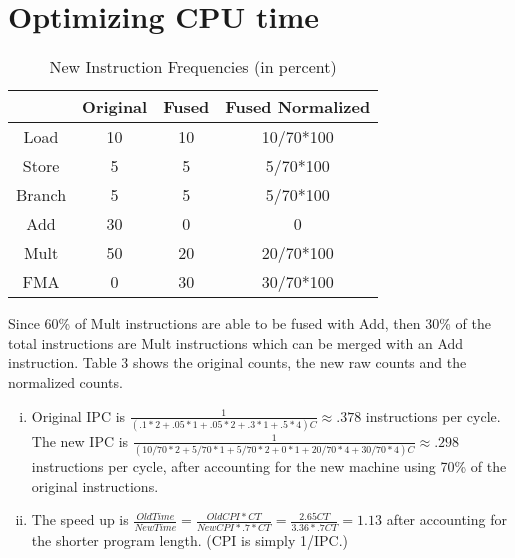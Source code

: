 \documentclass[a4paper,11pt]{article}
\theoremstyle{mytheor}
\begin{document}
\section{Optimizing CPU time}
\begin{table}[H]
\caption{New Instruction Frequencies (in percent)}
\begin{center}
\begin{tabular}{|c|c|c|c|}
\hline
&Original & Fused & Fused Normalized\\
\hline
Load & 10 & 10 & 10/70*100\\
Store & 5 & 5 & 5/70*100\\
Branch & 5 & 5 & 5/70*100\\
Add & 30 & 0 & 0\\
Mult & 50 & 20 & 20/70*100\\
FMA & 0 & 30 & 30/70*100\\
\hline
\end{tabular}
\end{center}
\label{default}
\end{table}%
Since 60\% of Mult instructions are able to be fused with Add, then 30\% of the total instructions are Mult instructions which can be merged with an Add instruction. Table 3 shows the original counts, the new raw counts and the normalized counts.
\begin{enumerate}[i.]
\item Original IPC is $\frac{1}{(.1*2+.05*1+.05*2+.3*1+.5*4)C} \approx .378$ instructions per cycle.\\ The new IPC is $\frac{1}{(10/70*2+5/70*1+5/70*2+0*1+20/70*4+30/70*4)C} \approx .298$ instructions per cycle, after accounting for the new machine using 70\% of the original instructions.
\item The speed up is $ \frac{OldTime}{NewTime}=\frac{OldCPI*CT}{NewCPI*.7*CT}=\frac{2.65 CT}{3.36*.7 CT}=1.13$ after accounting for the shorter program length. (CPI is simply 1/IPC.)
\end{enumerate}
\end{document}
